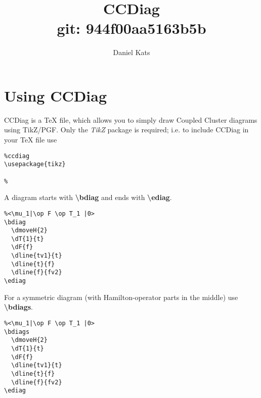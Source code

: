 \documentclass[a4paper]{article}
\begin{document}
\author{Daniel Kats}
\title{CCDiag \\ \normalsize git: 944f00aa5163b5b}

\maketitle

\tableofcontents

\section{Using CCDiag}

CCDiag is a TeX file, which allows you to simply draw Coupled Cluster diagrams using TikZ/PGF.
Only the {\it TikZ} package is required; i.e. to include CCDiag in your TeX file use
\begin{lstlisting}
%ccdiag
\usepackage{tikz}

%  
\end{lstlisting}

A diagram starts with {\bf \textbackslash bdiag} and ends with {\bf \textbackslash ediag}.

 \begin{minipage}[b]{0.55\linewidth}\centering
  \begin{lstlisting}
%<\mu_1|\op F \op T_1 |0>
\bdiag
  \dmoveH{2}
  \dT{1}{t}
  \dF{f}
  \dline{tv1}{t}
  \dline{t}{f}
  \dline{f}{fv2}
\ediag 
  \end{lstlisting}
 \end{minipage}
 \begin{minipage}[b]{0.45\linewidth}\centering
    \bdiag
    \ediag
 \end{minipage}

For a symmetric diagram (with Hamilton-operator parts in the middle) use {\bf \textbackslash bdiags}.

 \begin{minipage}[b]{0.55\linewidth}\centering
  \begin{lstlisting}
%<\mu_1|\op F \op T_1 |0>
\bdiags
  \dmoveH{2}
  \dT{1}{t}
  \dF{f}
  \dline{tv1}{t}
  \dline{t}{f}
  \dline{f}{fv2}
\ediag 
  \end{lstlisting}
 \end{minipage}
 \begin{minipage}[b]{0.45\linewidth}\centering
    \bdiags
    \ediag
 \end{minipage}
\end{document}
